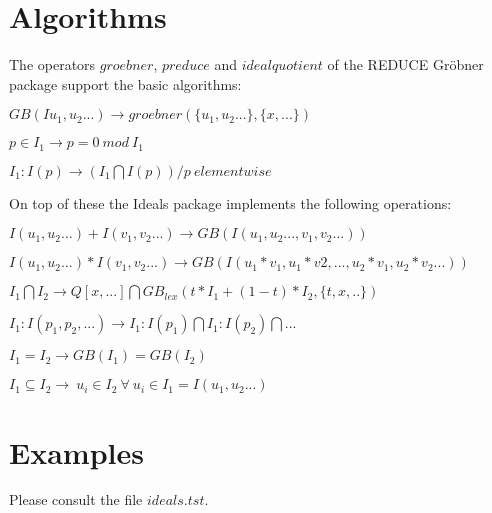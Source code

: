 \section{Algorithms}

The operators $groebner$, $preduce$ and $idealquotient$ of the 
REDUCE Gr\"obner package support the basic algorithms:

$GB(Iu_1,u_2...) \rightarrow groebner(\{u_1,u_2...\},\{x,...\})$

$p \in I_1 \rightarrow p=0 \ mod \ I_1$

$I_1 : I(p) \rightarrow (I_1 \bigcap I(p)) / p \ elementwise$

\noindent
On top of these the Ideals package implements the following 
operations:


$I(u_1,u_2...)+I(v_1,v_2...) \rightarrow GB(I(u_1,u_2...,v_1,v_2...))$


$I(u_1,u_2...)*I(v_1,v_2...)\rightarrow 
 GB(I(u_1*v_1,u_1*v2,...,u_2*v_1,u_2*v_2...))$


$I_1 \bigcap I_2 \rightarrow
  Q[x,...] \bigcap GB_{lex}(t*I_1 + (1-t)*I_2,\{t,x,..\}) $


$I_1 : I(p_1,p_2,...) \rightarrow I_1 : I(p_1) \bigcap I_1 : I(p_2)
\bigcap ...$

$I_1 = I_2 \rightarrow GB(I_1)=GB(I_2)$

$I_1 \subseteq I_2
   \rightarrow \ u_i \in I_2 \ \forall \ u_i \in I_1=I(u_1,u_2...)$

\section{Examples}

Please consult the file $ideals.tst$.

